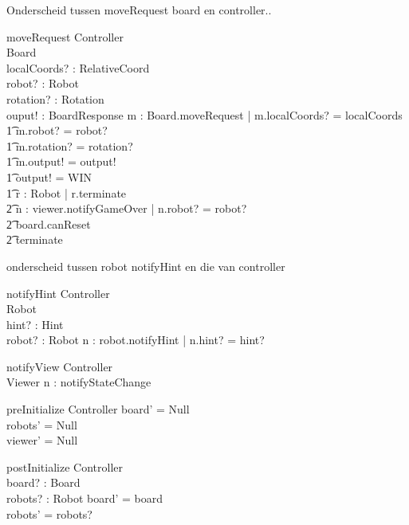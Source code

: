 \documentclass[a4paper,11pt]{article}
\begin{document}
Onderscheid tussen moveRequest board en controller..
\begin{schema}{moveRequest}
\Xi Controller \\
\Delta Board \\
localCoords? : RelativeCoord \\
robot? : Robot \\
rotation? : Rotation \\
ouput! : BoardResponse
\where
\exists m : Board.moveRequest | m.localCoords? = localCoords \\ \t1
m.robot? = robot? \\ \t1
m.rotation? = rotation? \\ \t1
m.output! = output! \\ \t1
\IF output! = WIN \\ \t1
\THEN \forall r : Robot | r.terminate \\ \t2
\exists n : viewer.notifyGameOver | n.robot? = robot? \\ \t2
board.canReset \\ \t2
terminate
\end{schema}

onderscheid tussen robot notifyHint en die van controller
\begin{schema}{notifyHint}
\Xi Controller \\
\Delta Robot \\
hint? : Hint \\
robot? : Robot
\where
\exists n : robot.notifyHint | n.hint? = hint?
\end{schema}

\begin{schema}{notifyView}
\Xi Controller \\
\Delta Viewer
\where
\exists n : notifyStateChange
\end{schema}

\begin{schema}{preInitialize}
\Delta Controller
\where
board' = Null \\
robots' = Null \\
viewer' = Null
\end{schema}

\begin{schema}{postInitialize}
\Delta Controller \\
board? : Board \\
robots? : \power Robot 
\where
board' = board \\
robots' = robots?
\end{schema}
\end{document}

